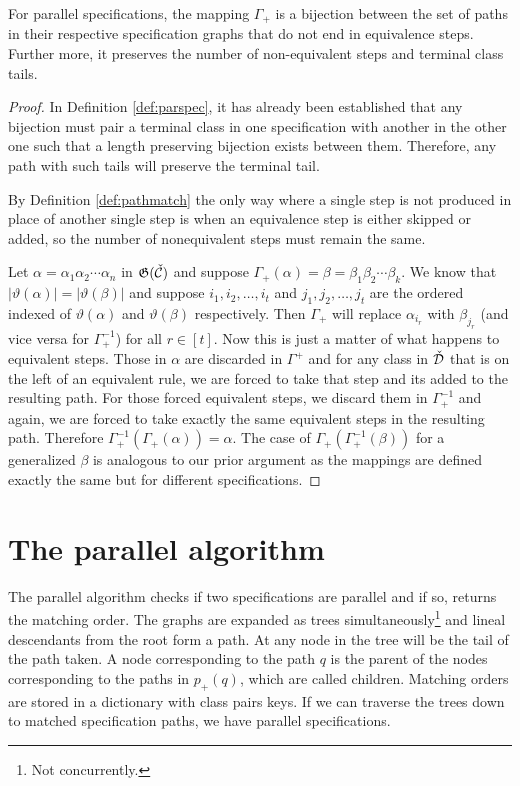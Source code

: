 \begin{proposition}
For parallel specifications, the mapping $\Gamma_+$ is a bijection between the set of paths in their respective specification graphs that do not end in equivalence steps. Further more, it preserves the number of non-equivalent steps and terminal class tails. 
\end{proposition}
\begin{proof}
In Definition \ref{def:parspec}, it has already been established that any bijection must pair a terminal class in one specification with another in the other one such that a length preserving bijection exists between them. Therefore, any path with such tails will preserve the terminal tail.

By Definition \ref{def:pathmatch} the only way where a single step is not produced in place of another single step is when an equivalence step is either skipped or added, so the number of nonequivalent steps must remain the same.

Let $\alpha = \alpha_1\alpha_2 \dotsm \alpha_n$ in $\mathfrak{G}(\check{\mathcal{C}})$ and suppose $\Gamma_+(\alpha) = \beta = \beta_1\beta_2 \dotsm \beta_k$. We know that $|\vartheta(\alpha)| = |\vartheta(\beta)|$ and suppose $i_1, i_2,\dotsc, i_t$ and $j_1,j_2,\dotsc,j_t$ are the ordered indexed of $\vartheta(\alpha)$ and $\vartheta(\beta)$ respectively. Then $\Gamma_+$ will replace $\alpha_{i_r}$ with $\beta_{j_r}$ (and vice versa for $\Gamma_+^{-1}$) for all $r \in [t]$. Now this is just a matter of what happens to equivalent steps. Those in $\alpha$ are discarded in $\Gamma^+$ and for any class in $\check{\mathcal{D}}$ that is on the left of an equivalent rule, we are forced to take that step and its added to the resulting path. For those forced equivalent steps, we discard them in $\Gamma^{-1}_+$ and again, we are forced to take exactly the same equivalent steps in the resulting path. Therefore $\Gamma_+^{-1}(\Gamma_+(\alpha)) = \alpha$. The case of $\Gamma_+(\Gamma^{-1}_+(\beta))$ for a generalized $\beta$ is analogous to our prior argument as the mappings are defined exactly the same but for different specifications.
\end{proof}

\section{The parallel algorithm}
The parallel algorithm checks if two specifications are parallel and if so, returns the matching order. The graphs are expanded as trees simultaneously\footnote{Not concurrently.} and lineal descendants from the root form a path. At any node in the tree will be the tail of the path taken. A node corresponding to the path $q$ is the parent of the nodes corresponding to the paths in $p_+(q)$, which are called children. Matching orders are stored in a dictionary with class pairs keys. If we can traverse the trees down to matched specification paths, we have parallel specifications.

